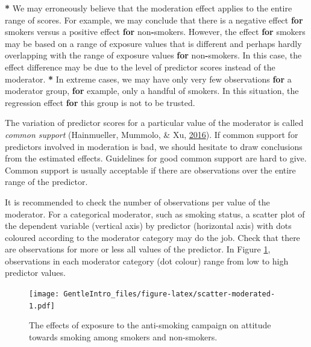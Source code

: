 \documentclass[a4paper]{book}
\newenvironment{Shaded}{\begin{snugshade}}{\end{snugshade}}
\newcommand{\StringTok}[1]{\textcolor[rgb]{0.00,0.00,0.00}{#1}}
\newcommand{\ControlFlowTok}[1]{\textcolor[rgb]{0.00,0.00,0.00}{\textbf{#1}}}
\newcommand{\OperatorTok}[1]{\textcolor[rgb]{0.00,0.00,0.00}{\textbf{#1}}}
\newcommand{\NormalTok}[1]{#1}
\theoremstyle{definition}
\theoremstyle{definition}
\theoremstyle{definition}
\theoremstyle{remark}
\begin{document}
\begin{Shaded}
\begin{Highlighting}[]
\OperatorTok{*}\StringTok{ }\NormalTok{We may erroneously believe that the moderation effect applies to the entire}
\NormalTok{range of scores. For example, we may conclude that there is a negative effect}
\ControlFlowTok{for}\NormalTok{ smokers versus a positive effect }\ControlFlowTok{for}\NormalTok{ non}\OperatorTok{-}\NormalTok{smokers. However, the effect }\ControlFlowTok{for}
\NormalTok{smokers may be based on a range of exposure values that is different and}
\NormalTok{perhaps hardly overlapping with the range of exposure values }\ControlFlowTok{for}\NormalTok{ non}\OperatorTok{-}\NormalTok{smokers.}
\NormalTok{In this case, the effect difference may be due to the level of predictor scores}
\NormalTok{instead of the moderator.}
\OperatorTok{*}\StringTok{ }\NormalTok{In extreme cases, we may have only very few observations }\ControlFlowTok{for}\NormalTok{ a moderator}
\NormalTok{group, }\ControlFlowTok{for}\NormalTok{ example, only a handful of smokers. In this situation, the}
\NormalTok{regression effect }\ControlFlowTok{for}\NormalTok{ this group is not to be trusted.}
\end{Highlighting}
\end{Shaded}

The variation of predictor scores for a particular value of the
moderator is called \emph{common support} (Hainmueller, Mummolo, \& Xu,
\protect\hyperlink{ref-RefWorks:3838}{2016}). If common support for
predictors involved in moderation is bad, we should hesitate to draw
conclusions from the estimated effects. Guidelines for good common
support are hard to give. Common support is usually acceptable if there
are observations over the entire range of the predictor.

It is recommended to check the number of observations per value of the
moderator. For a categorical moderator, such as smoking status, a
scatter plot of the dependent variable (vertical axis) by predictor
(horizontal axis) with dots coloured according to the moderator category
may do the job. Check that there are observations for more or less all
values of the predictor. In Figure \ref{fig:scatter-moderated},
observations in each moderator category (dot colour) range from low to
high predictor values.

\begin{figure}[H]
\centering
\texttt{[image: GentleIntro\_files/figure-latex/scatter-moderated-1.pdf]}
\caption{\label{fig:scatter-moderated}The effects of exposure to the
anti-smoking campaign on attitude towards smoking among smokers and
non-smokers.}
\end{figure}
\end{document}
